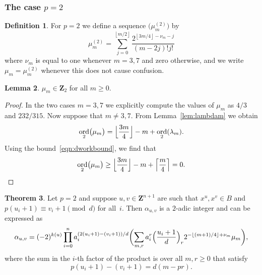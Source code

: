 \documentclass[a4paper,11pt]{article}
\numberwithin{equation}{section}
\providecommand{\floor}[1]{\left\lfloor#1\right\rfloor}   %
\providecommand{\floorBig}[1]{\Bigl\lfloor#1\Bigr\rfloor} %
\providecommand{\ceil}[1]{\left\lceil#1\right\rceil}   %
\newcommand{\ZZ}{\mathbf{Z}} %
\DeclareMathOperator{\ord}{ord}          %
\theoremstyle{definition}
\newtheorem{thm}{Theorem}[section]
\newtheorem{lem}[thm]{Lemma}
\newtheorem{defn}[thm]{Definition}
\begin{document}
\subsubsection{The case $p = 2$}

\begin{defn} \label{defn:mu2}
For $p = 2$ we define a sequence $\bigl(\mu_m^{(2)}\bigr)$ by 
\begin{equation*}
\mu_m^{(2)} = 
    \sum_{j=0}^{\floor{m/2}} \frac{2^{\floor{3m/4} - \nu_m - j}}{(m-2j)! j!}
\end{equation*}
where $\nu_m$ is equal to one whenever $m = 3, 7$ and zero otherwise, 
and we write $\mu_m =\mu_m^{(2)}$ whenever this does not cause confusion. 
\end{defn}

\begin{lem} \label{lem:mu2}
$\mu_m \in \ZZ_2$ for all $m \geq 0$.
\end{lem}

\begin{proof}
In the two cases $m = 3, 7$ we explicitly compute the values of 
$\mu_m$ as $4/3$ and $232/315$.  Now suppose that $m \neq 3, 7$. 
From Lemma~\ref{lem:lambdam} we obtain 
\begin{equation*}
\ord_2 \bigl(\mu_m\bigr) 
    = \floorBig{\frac{3m}{4}} - m + \ord_2(\lambda_m).
\end{equation*}
Using the bound~\eqref{eqn:dworkbound}, we find that 
\begin{equation*}
\ord_2 \bigl(\mu_m\bigr) 
    \geq \floorBig{\frac{3m}{4}} - m + \ceil{\frac{m}{4}} = 0. \qedhere
\end{equation*}
\end{proof}

\begin{thm} \label{thm:alpha2}
Let $p = 2$ and suppose $u, v \in \ZZ^{n+1}$ are such that 
$x^u, x^v \in B$ and $p (u_i + 1) \equiv v_i + 1 \pmod{d}$ 
for all~$i$.  Then $\alpha_{u,v}$ is a $2$-adic integer and can be expressed as 
\begin{equation*}
\alpha_{u,v} = (-2)^{k(u)} \prod_{i=0}^n a_i^{(2 (u_i + 1) - (v_i + 1))/d} \biggl( \sum_{m,r} a_i^{r} \Bigl(\frac{u_i+1}{d}\Bigr)_r 2^{-\floor{(m+1)/4}+\nu_m} \mu_m \biggr), 
\end{equation*}
where the sum in the $i$-th factor of the product is over all $m, r \geq 0$  
that satisfy
\[
p(u_i+1)-(v_i+1)=d(m-pr).
\]
\end{thm}
\end{document}
